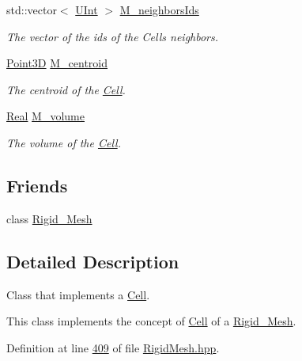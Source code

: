 \begin{DoxyCompactItemize}
std\+::vector$<$ \hyperlink{namespaceFVCode3D_a4bf7e328c75d0fd504050d040ebe9eda}{U\+Int} $>$ \hyperlink{classFVCode3D_1_1Rigid__Mesh_1_1Cell_a660774a8bb678b874639c9c1ea713bc6}{M\+\_\+neighbors\+Ids}
\begin{DoxyCompactList}\small\item\em The vector of the ids of the Cells neighbors. \end{DoxyCompactList}\item 
\hyperlink{classFVCode3D_1_1Point3D}{Point3D} \hyperlink{classFVCode3D_1_1Rigid__Mesh_1_1Cell_a5c7626d4a6faec9e43429166dcad110b}{M\+\_\+centroid}
\begin{DoxyCompactList}\small\item\em The centroid of the \hyperlink{classFVCode3D_1_1Rigid__Mesh_1_1Cell}{Cell}. \end{DoxyCompactList}\item 
\hyperlink{namespaceFVCode3D_a40c1f5588a248569d80aa5f867080e83}{Real} \hyperlink{classFVCode3D_1_1Rigid__Mesh_1_1Cell_aeda1d5ff8f04d9e93919f454e3f44021}{M\+\_\+volume}
\begin{DoxyCompactList}\small\item\em The volume of the \hyperlink{classFVCode3D_1_1Rigid__Mesh_1_1Cell}{Cell}. \end{DoxyCompactList}\end{DoxyCompactItemize}
\subsection*{Friends}
\begin{DoxyCompactItemize}
\item 
class \hyperlink{classFVCode3D_1_1Rigid__Mesh_1_1Cell_a43983e56a64f3bc6fc936f03c4b170bb}{Rigid\+\_\+\+Mesh}
\end{DoxyCompactItemize}


\subsection{Detailed Description}
Class that implements a \hyperlink{classFVCode3D_1_1Rigid__Mesh_1_1Cell}{Cell}. 

This class implements the concept of \hyperlink{classFVCode3D_1_1Rigid__Mesh_1_1Cell}{Cell} of a \hyperlink{classFVCode3D_1_1Rigid__Mesh}{Rigid\+\_\+\+Mesh}. 

Definition at line \hyperlink{RigidMesh_8hpp_source_l00409}{409} of file \hyperlink{RigidMesh_8hpp_source}{Rigid\+Mesh.\+hpp}.



